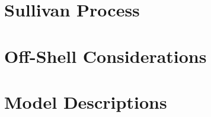 \label{Chapter-3}

\hypertarget{Section-3.1}{%
\section{Sullivan Process}\label{Section-3.1}}

\hypertarget{Section-3.2}{%
\section{Off-Shell Considerations}\label{Section-3.2}}

\hypertarget{Section-3.3}{%
\section{Model Descriptions}\label{Section-3.3}}


